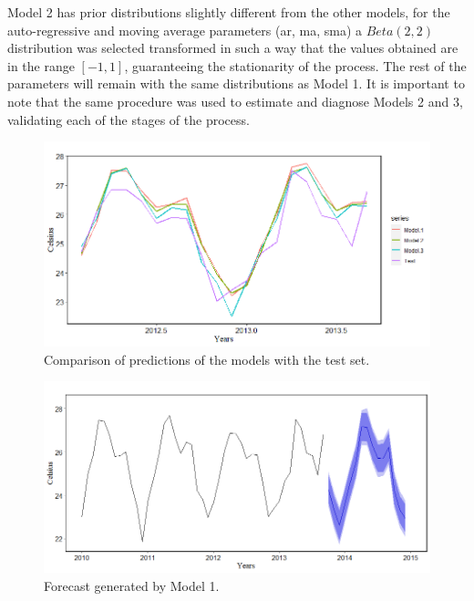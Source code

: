 Model 2 has prior distributions slightly different from the other models, for the auto-regressive and moving average parameters (ar, ma, sma) a $Beta(2,2)$ distribution was selected transformed in such a way that the values obtained are in the range $[-1,1]$, guaranteeing the stationarity of the process. The rest of the parameters will remain with the same distributions as Model 1. It is important to note that the same procedure was used to estimate and diagnose Models 2 and 3, validating each of the stages of the process.
%
\begin{figure}[!ht]
	\centering
	\includegraphics[scale=0.5]{Figs/77}
	\caption{Comparison of predictions of the models with the test set.}
	\label{fig:comp}
\end{figure}
%
\begin{figure}[!ht]
	\centering
	\includegraphics[scale=0.5]{Figs/88}
	\caption{Forecast generated by Model 1.}
	\label{fig:comp}
\end{figure}
